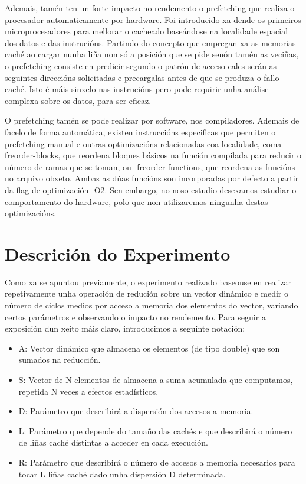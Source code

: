 \documentclass[letterpaper, 10 pt,spanish, conference]{ieeeconf}  %
\begin{document}
Ademais, tamén ten un forte impacto no rendemento o prefetching que realiza o procesador automaticamente por hardware. Foi introducido xa dende os primeiros microprocesadores para mellorar o cacheado baseándose na localidade espacial dos datos e das instrucións. Partindo do concepto que empregan xa as memorias caché ao cargar nunha liña non só a posición que se pide senón tamén as veciñas, o prefetching consiste en predicir segundo o patrón de acceso cales serán as seguintes direccións solicitadas e precargalas antes de que se produza o fallo caché. Isto é máis sinxelo nas instrucións pero pode requirir unha análise complexa sobre os datos, para ser eficaz.

O prefetching tamén se pode realizar por software, nos compiladores. Ademais de facelo de forma automática, existen instruccións especificas que permiten o prefetching manual e outras optimizacións relacionadas coa localidade, coma -freorder-blocks, que reordena bloques básicos na función compilada para reducir o número de ramas que se toman, ou -freorder-functions, que reordena as funcións no arquivo obxeto. Ambas as dúas funcións son incorporadas por defecto a partir da flag de optimización -O2. Sen embargo, no noso estudio desexamos estudiar o comportamento do hardware, polo que non utilizaremos ningunha destas optimizacións.

\section{Descrición do Experimento}

Como xa se apuntou previamente, o experimento realizado baseouse en realizar repetivamente unha operación de redución sobre un vector dinámico e medir o número de ciclos medios por acceso a memoria dos elementos do vector, variando certos parámetros e observando o impacto no rendemento. Para seguir a exposición dun xeito máis claro, introducimos a seguinte notación:

\begin{itemize}
    \item A: Vector dinámico que almacena os elementos (de tipo double) que son sumados na reducción.
    \item S: Vector de N elementos de almacena a suma acumulada que computamos, repetida N veces a efectos estadísticos.
    \item D: Parámetro que describirá a dispersión dos accesos a memoria.
    \item L: Parámetro que depende do tamaño das cachés e que describirá o número de liñas caché distintas a acceder en cada execución.
    \item R: Parámetro que describirá o número de accesos a memoria necesarios para tocar L liñas caché dado unha dispersión D determinada.
\end{itemize}
\end{document}

